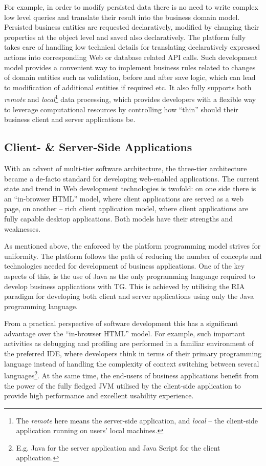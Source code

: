   For example, in order to modify persisted data there is no need to write complex low level queries and translate their result into the business domain model.
  Persisted business entities are requested declaratively, modified by changing their properties at the object level and saved also declaratively.
  The platform fully takes care of handling low technical details for translating declaratively expressed actions into corresponding Web or database related API calls.
  Such development model provides a convenient way to implement business rules related to changes of domain entities such as validation, before and after save logic, which can lead to modification of additional entities if required etc.
  It also fully supports both \emph{remote} and \emph{local}\footnote{The \emph{remote} here means the server-side application, and \emph{local} -- the client-side application running on users' local machines.} data processing, which provides developers with a flexible way to leverage computational resources by controlling how ``thin'' should their business client and server applications be.

  \subsection{Client- \& Server-Side Applications}
  With an advent of multi-tier software architecture, the three-tier architecture became a de-facto standard for developing web-enabled applications.
  The current state and trend in Web development technologies is twofold: on one side there is an ``in-browser HTML'' model, where client applications are served as a web page, on another -- rich client application model, where client applications are fully capable desktop applications.
  Both models have their strengths and weaknesses.

  As mentioned above, the enforced by the platform programming model strives for uniformity. 
  The platform follows the path of reducing the number of concepts and technologies needed for development of business applications.
  One of the key aspects of this, is the use of Java as the only programming language required to develop business applications with TG.
  This is achieved by utilising the RIA paradigm for developing both client and server applications using only the Java programming language.
  
  From a practical perspective of software development this has a significant advantage over the ``in-browser HTML'' model.  
  For example, such important activities as debugging and profiling are performed in a familiar environment of the preferred IDE, where developers think in terms of their primary programming language instead of handling the complexity of context switching between several languages\footnote{E.g. Java for the server application and Java Script for the client application.}.
  At the same time, the end-users of business applications benefit from the power of the fully fledged JVM utilised by the client-side application to provide high performance and excellent usability experience.
  
